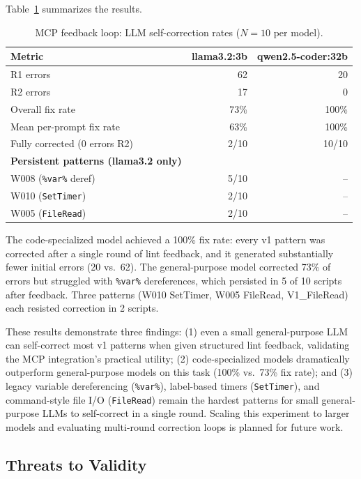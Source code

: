 \documentclass[11pt,a4paper]{article}
\begin{document}
Table~\ref{tab:mcp_loop} summarizes the results.

\begin{table}[h]
\centering\small
\caption{MCP feedback loop: LLM self-correction rates ($N=10$ per model).}
\label{tab:mcp_loop}
\begin{tabular}{lrr}
\toprule
\textbf{Metric} & \textbf{llama3.2:3b} & \textbf{qwen2.5-coder:32b} \\
\midrule
R1 errors & 62 & 20 \\
R2 errors & 17 & 0 \\
Overall fix rate & 73\% & 100\% \\
Mean per-prompt fix rate & 63\% & 100\% \\
Fully corrected (0 errors R2) & 2/10 & 10/10 \\
\midrule
\textbf{Persistent patterns (llama3.2 only)} \\
\quad W008 (\texttt{\%var\%} deref) & 5/10 & -- \\
\quad W010 (\texttt{SetTimer}) & 2/10 & -- \\
\quad W005 (\texttt{FileRead}) & 2/10 & -- \\
\bottomrule
\end{tabular}
\end{table}

The code-specialized model achieved a 100\% fix rate: every v1 pattern was corrected after a single round of lint feedback, and it generated substantially fewer initial errors (20 vs.\ 62). The general-purpose model corrected 73\% of errors but struggled with \texttt{\%var\%} dereferences, which persisted in 5 of 10 scripts after feedback. Three patterns (W010 SetTimer, W005 FileRead, V1\_FileRead) each resisted correction in 2 scripts.

These results demonstrate three findings: (1) even a small general-purpose LLM can self-correct most v1 patterns when given structured lint feedback, validating the MCP integration's practical utility; (2) code-specialized models dramatically outperform general-purpose models on this task (100\% vs.\ 73\% fix rate); and (3) legacy variable dereferencing (\texttt{\%var\%}), label-based timers (\texttt{SetTimer}), and command-style file I/O (\texttt{FileRead}) remain the hardest patterns for small general-purpose LLMs to self-correct in a single round. Scaling this experiment to larger models and evaluating multi-round correction loops is planned for future work.

\subsection{Threats to Validity}
\end{document}
